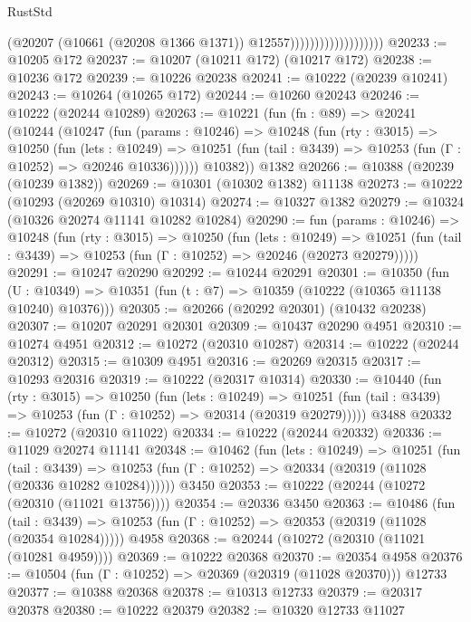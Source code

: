 \begin{lexlean}{RustStd}
\begin{coremodule}
                                        (@20207
                                          (@10661 (@20208 @1366 @1371))
                                          @12557)))))))))))))))))))
@20233 := @10205 @172
@20237 := @10207 (@10211 @172) (@10217 @172)
@20238 := @10236 @172
@20239 := @10226 @20238
@20241 := @10222 (@20239 @10241)
@20243 := @10264 (@10265 @172)
@20244 := @10260 @20243
@20246 := @10222 (@20244 @10289)
@20263 := @10221
    (fun (fn : @89) =>
    @20241
      (@10244
        (@10247
          (fun (params : @10246) =>
          @10248
            (fun (rty : @3015) =>
            @10250
              (fun (lets : @10249) =>
              @10251 (fun (tail : @3439) => @10253 (fun (Γ : @10252) => @20246 @10336))))))
        @10382))
    @1382
@20266 := @10388 (@20239 (@10239 @1382))
@20269 := @10301 (@10302 @1382) @11138
@20273 := @10222 (@10293 (@20269 @10310) @10314)
@20274 := @10327 @1382
@20279 := @10324 (@10326 @20274 @11141 @10282 @10284)
@20290 := fun (params : @10246) =>
  @10248
    (fun (rty : @3015) =>
    @10250
      (fun (lets : @10249) =>
      @10251 (fun (tail : @3439) => @10253 (fun (Γ : @10252) => @20246 (@20273 @20279)))))
@20291 := @10247 @20290
@20292 := @10244 @20291
@20301 := @10350
    (fun (U : @10349) => @10351 (fun (t : @7) => @10359 (@10222 (@10365 @11138 @10240) @10376)))
@20305 := @20266 (@20292 @20301) (@10432 @20238)
@20307 := @10207 @20291 @20301
@20309 := @10437 @20290 @4951
@20310 := @10274 @4951
@20312 := @10272 (@20310 @10287)
@20314 := @10222 (@20244 @20312)
@20315 := @10309 @4951
@20316 := @20269 @20315
@20317 := @10293 @20316
@20319 := @10222 (@20317 @10314)
@20330 := @10440
    (fun (rty : @3015) =>
    @10250
      (fun (lets : @10249) =>
      @10251 (fun (tail : @3439) => @10253 (fun (Γ : @10252) => @20314 (@20319 @20279)))))
    @3488
@20332 := @10272 (@20310 @11022)
@20334 := @10222 (@20244 @20332)
@20336 := @11029 @20274 @11141
@20348 := @10462
    (fun (lets : @10249) =>
    @10251
      (fun (tail : @3439) =>
      @10253 (fun (Γ : @10252) => @20334 (@20319 (@11028 (@20336 @10282 @10284))))))
    @3450
@20353 := @10222 (@20244 (@10272 (@20310 (@11021 @13756))))
@20354 := @20336 @3450
@20363 := @10486
    (fun (tail : @3439) => @10253 (fun (Γ : @10252) => @20353 (@20319 (@11028 (@20354 @10284)))))
    @4958
@20368 := @20244 (@10272 (@20310 (@11021 (@10281 @4959))))
@20369 := @10222 @20368
@20370 := @20354 @4958
@20376 := @10504 (fun (Γ : @10252) => @20369 (@20319 (@11028 @20370))) @12733
@20377 := @10388 @20368
@20378 := @10313 @12733
@20379 := @20317 @20378
@20380 := @10222 @20379
@20382 := @10320 @12733 @11027

\end{coremodule}
\end{lexlean}
